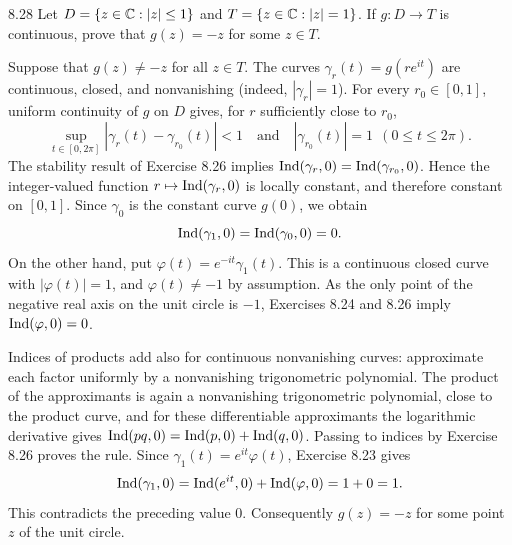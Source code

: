 \documentclass[11pt, oneside]{article}
\begin{document}
\begin{exercise}{8.28}
Let $D=\{z\in\mathbb{C}:|z|\le1\}$ and $T=\{z\in\mathbb{C}:|z|=1\}$. If $g:D\to T$ is continuous, prove that $g(z)=-z$ for some $z\in T$.
\end{exercise}
\begin{solution}
Suppose that $g(z)\ne-z$ for all $z\in T$. The curves $\gamma_r(t)=g(re^{it})$ are continuous, closed, and nonvanishing (indeed, $|\gamma_r|=1$). For every $r_0\in[0, 1]$, uniform continuity of $g$ on $D$ gives, for $r$ sufficiently close to $r_0$,
\[
 \sup_{t\in[0, 2\pi]}|\gamma_r(t)-\gamma_{r_0}(t)|<1
 \quad\text{and}\quad |\gamma_{r_0}(t)|=1\ \ (0\le t\le2\pi).
\]
The stability result of Exercise 8.26 implies $\operatorname{Ind}(\gamma_r, 0)=\operatorname{Ind}(\gamma_{r_0}, 0)$. Hence the integer-valued function $r\mapsto\operatorname{Ind}(\gamma_r, 0)$ is locally constant, and therefore constant on $[0, 1]$. Since $\gamma_0$ is the constant curve $g(0)$, we obtain
\[
 \operatorname{Ind}(\gamma_1, 0)=\operatorname{Ind}(\gamma_0, 0)=0.
\]
On the other hand, put $\varphi(t)=e^{-it}\gamma_1(t)$. This is a continuous closed curve with $|\varphi(t)|=1$, and $\varphi(t)\ne-1$ by assumption. As the only point of the negative real axis on the unit circle is $-1$, Exercises 8.24 and 8.26 imply $\operatorname{Ind}(\varphi, 0)=0$.

Indices of products add also for continuous nonvanishing curves: approximate each factor uniformly by a nonvanishing trigonometric polynomial. The product of the approximants is again a nonvanishing trigonometric polynomial, close to the product curve, and for these differentiable approximants the logarithmic derivative gives $\operatorname{Ind}(pq, 0)=\operatorname{Ind}(p, 0)+\operatorname{Ind}(q, 0)$. Passing to indices by Exercise 8.26 proves the rule. Since $\gamma_1(t)=e^{it}\varphi(t)$, Exercise 8.23 gives
\[
 \operatorname{Ind}(\gamma_1, 0)=\operatorname{Ind}(e^{it}, 0)+\operatorname{Ind}(\varphi, 0)=1+0=1.
\]
This contradicts the preceding value $0$. Consequently $g(z)=-z$ for some point $z$ of the unit circle.
\end{solution}
\end{document}
